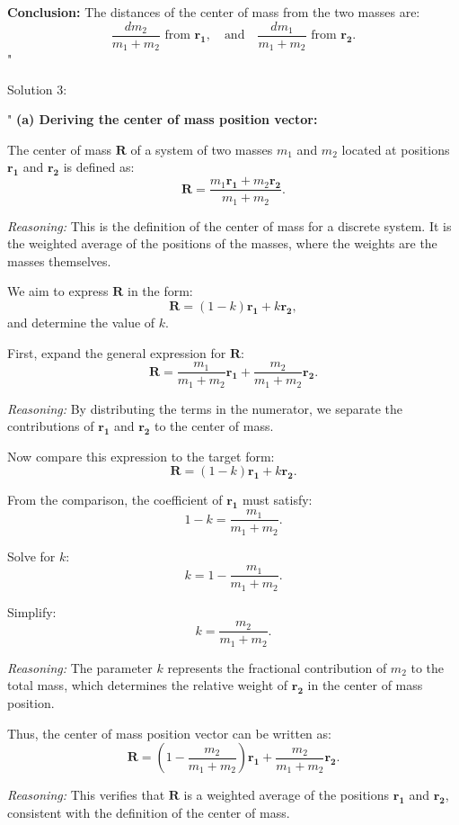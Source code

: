 \textbf{Conclusion:} The distances of the center of mass from the two masses are:
\[
\frac{dm_2}{m_1 + m_2} \text{ from } \mathbf{r_1}, \quad \text{and} \quad \frac{dm_1}{m_1 + m_2} \text{ from } \mathbf{r_2}.
\]"

Solution 3:

"
\textbf{(a) Deriving the center of mass position vector:}

The center of mass $\mathbf{R}$ of a system of two masses $m_1$ and $m_2$ located at positions $\mathbf{r_1}$ and $\mathbf{r_2}$ is defined as:
\[
\mathbf{R} = \frac{m_1 \mathbf{r_1} + m_2 \mathbf{r_2}}{m_1 + m_2}.
\]

\textit{Reasoning:} This is the definition of the center of mass for a discrete system. It is the weighted average of the positions of the masses, where the weights are the masses themselves.

We aim to express $\mathbf{R}$ in the form:
\[
\mathbf{R} = (1 - k)\mathbf{r_1} + k\mathbf{r_2},
\]
and determine the value of $k$.

First, expand the general expression for $\mathbf{R}$:
\[
\mathbf{R} = \frac{m_1}{m_1 + m_2} \mathbf{r_1} + \frac{m_2}{m_1 + m_2} \mathbf{r_2}.
\]

\textit{Reasoning:} By distributing the terms in the numerator, we separate the contributions of $\mathbf{r_1}$ and $\mathbf{r_2}$ to the center of mass.

Now compare this expression to the target form:
\[
\mathbf{R} = (1 - k)\mathbf{r_1} + k\mathbf{r_2}.
\]

From the comparison, the coefficient of $\mathbf{r_1}$ must satisfy:
\[
1 - k = \frac{m_1}{m_1 + m_2}.
\]

Solve for $k$:
\[
k = 1 - \frac{m_1}{m_1 + m_2}.
\]

Simplify:
\[
k = \frac{m_2}{m_1 + m_2}.
\]

\textit{Reasoning:} The parameter $k$ represents the fractional contribution of $m_2$ to the total mass, which determines the relative weight of $\mathbf{r_2}$ in the center of mass position.

Thus, the center of mass position vector can be written as:
\[
\mathbf{R} = (1 - \frac{m_2}{m_1 + m_2})\mathbf{r_1} + \frac{m_2}{m_1 + m_2}\mathbf{r_2}.
\]

\textit{Reasoning:} This verifies that $\mathbf{R}$ is a weighted average of the positions $\mathbf{r_1}$ and $\mathbf{r_2}$, consistent with the definition of the center of mass.

\bigskip

